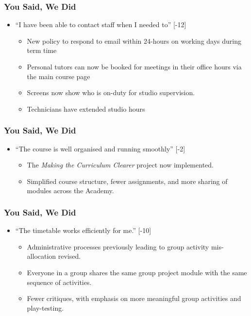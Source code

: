 \begin{frame}
	\frametitle{You Said, We Did}
			
	\begin{itemize}
		
		\item ``I have been able to contact staff when I needed to'' [-12]
		\begin{itemize}
			\item New policy to respond to email within 24-hours on working days during term time 
			\item Personal tutors can now be booked for meetings in their office hours via the main course page
			\item Screens now show who is on-duty for studio supervision. 
			\item Technicians have extended studio hours
		\end{itemize}		
		
	\end{itemize}
\end{frame}

\begin{frame}
	\frametitle{You Said, We Did}
		
	\begin{itemize}
	
			\item ``The course is well organised and running smoothly'' [-2]
		\begin{itemize}
			\item The \textit{Making the Curriculum Clearer} project now implemented.
			\item Simplified course structure, fewer assignments, and more sharing of modules across the Academy.
		\end{itemize}
		
	\end{itemize}
\end{frame}

\begin{frame}
	\frametitle{You Said, We Did}
		
	\begin{itemize}
		
		\item ``The timetable works efficiently for me.'' [-10]
		\begin{itemize}
			\item Administrative processes previously leading to group activity mis-allocation revised.
			\item Everyone in a group shares the same group project module with the same sequence of activities.
			\item Fewer critiques, with emphasis on more meaningful group activities and play-testing.
		\end{itemize}
		
	\end{itemize}
\end{frame}

